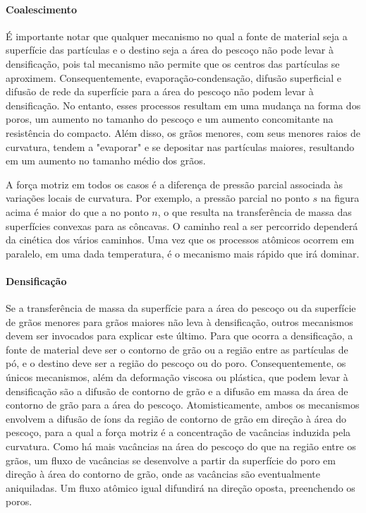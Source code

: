 \paragraph*{Coalescimento}

É importante notar que qualquer mecanismo no qual a fonte de material seja a superfície das partículas e o destino seja a área do pescoço não pode levar à densificação, pois tal mecanismo não permite que os centros das partículas se aproximem. Consequentemente, evaporação-condensação, difusão superficial e difusão de rede da superfície para a área do pescoço não podem levar à densificação. No entanto, esses processos resultam em uma mudança na forma dos poros, um aumento no tamanho do pescoço e um aumento concomitante na resistência do compacto. Além disso, os grãos menores, com seus menores raios de curvatura, tendem a "evaporar" e se depositar nas partículas maiores, resultando em um aumento no tamanho médio dos grãos.

A força motriz em todos os casos é a diferença de pressão parcial associada às variações locais de curvatura. Por exemplo, a pressão parcial no ponto $s$ na figura acima é maior do que a no ponto $n$, o que resulta na transferência de massa das superfícies convexas para as côncavas. O caminho real a ser percorrido dependerá da cinética dos vários caminhos. Uma vez que os processos atômicos ocorrem em paralelo, em uma dada temperatura, é o mecanismo mais rápido que irá dominar.

\paragraph*{Densificação}

Se a transferência de massa da superfície para a área do pescoço ou da superfície de grãos menores para grãos maiores não leva à densificação, outros mecanismos devem ser invocados para explicar este último. Para que ocorra a densificação, a fonte de material deve ser o contorno de grão ou a região entre as partículas de pó, e o destino deve ser a região do pescoço ou do poro. Consequentemente, os únicos mecanismos, além da deformação viscosa ou plástica, que podem levar à densificação são a difusão de contorno de grão e a difusão em massa da área de contorno de grão para a área do pescoço. Atomisticamente, ambos os mecanismos envolvem a difusão de íons da região de contorno de grão em direção à área do pescoço, para a qual a força motriz é a concentração de vacâncias induzida pela curvatura. Como há mais vacâncias na área do pescoço do que na região entre os grãos, um fluxo de vacâncias se desenvolve a partir da superfície do poro em direção à área do contorno de grão, onde as vacâncias são eventualmente aniquiladas. Um fluxo atômico igual difundirá na direção oposta, preenchendo os poros.

